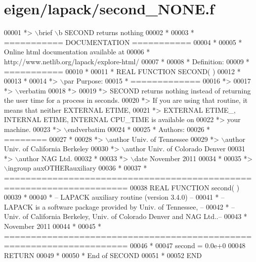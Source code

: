 \hypertarget{eigen_2lapack_2second___n_o_n_e_8f_source}{}\section{eigen/lapack/second\+\_\+\+N\+O\+NE.f}
\label{eigen_2lapack_2second___n_o_n_e_8f_source}

\begin{DoxyCode}
00001 \textcolor{comment}{*> \(\backslash\)brief \(\backslash\)b SECOND returns nothing}
00002 \textcolor{comment}{*}
00003 \textcolor{comment}{*  =========== DOCUMENTATION ===========}
00004 \textcolor{comment}{*}
00005 \textcolor{comment}{* Online html documentation available at }
00006 \textcolor{comment}{*            http://www.netlib.org/lapack/explore-html/ }
00007 \textcolor{comment}{*}
00008 \textcolor{comment}{*  Definition:}
00009 \textcolor{comment}{*  ===========}
00010 \textcolor{comment}{*}
00011 \textcolor{comment}{*      REAL FUNCTION SECOND( )}
00012 \textcolor{comment}{*  }
00013 \textcolor{comment}{*}
00014 \textcolor{comment}{*> \(\backslash\)par Purpose:}
00015 \textcolor{comment}{*  =============}
00016 \textcolor{comment}{*>}
00017 \textcolor{comment}{*> \(\backslash\)verbatim}
00018 \textcolor{comment}{*>}
00019 \textcolor{comment}{*>  SECOND returns nothing instead of returning the user time for a process in seconds.}
00020 \textcolor{comment}{*>  If you are using that routine, it means that neither EXTERNAL ETIME,}
00021 \textcolor{comment}{*>  EXTERNAL ETIME\_, INTERNAL ETIME, INTERNAL CPU\_TIME is available  on}
00022 \textcolor{comment}{*>  your machine.}
00023 \textcolor{comment}{*> \(\backslash\)endverbatim}
00024 \textcolor{comment}{*}
00025 \textcolor{comment}{*  Authors:}
00026 \textcolor{comment}{*  ========}
00027 \textcolor{comment}{*}
00028 \textcolor{comment}{*> \(\backslash\)author Univ. of Tennessee }
00029 \textcolor{comment}{*> \(\backslash\)author Univ. of California Berkeley }
00030 \textcolor{comment}{*> \(\backslash\)author Univ. of Colorado Denver }
00031 \textcolor{comment}{*> \(\backslash\)author NAG Ltd. }
00032 \textcolor{comment}{*}
00033 \textcolor{comment}{*> \(\backslash\)date November 2011}
00034 \textcolor{comment}{*}
00035 \textcolor{comment}{*> \(\backslash\)ingroup auxOTHERauxiliary}
00036 \textcolor{comment}{*}
00037 \textcolor{comment}{*  =====================================================================}
00038 \textcolor{keyword}{      REAL }\textcolor{keyword}{FUNCTION }second( )
00039 \textcolor{comment}{*}
00040 \textcolor{comment}{*  -- LAPACK auxiliary routine (version 3.4.0) --}
00041 \textcolor{comment}{*  -- LAPACK is a software package provided by Univ. of Tennessee,    --}
00042 \textcolor{comment}{*  -- Univ. of California Berkeley, Univ. of Colorado Denver and NAG Ltd..--}
00043 \textcolor{comment}{*     November 2011}
00044 \textcolor{comment}{*}
00045 \textcolor{comment}{* =====================================================================}
00046 \textcolor{comment}{*}
00047       second = 0.0e+0
00048       \textcolor{keywordflow}{RETURN}
00049 \textcolor{comment}{*}
00050 \textcolor{comment}{*     End of SECOND}
00051 \textcolor{comment}{*}
00052 \textcolor{keyword}{      END}
\end{DoxyCode}
